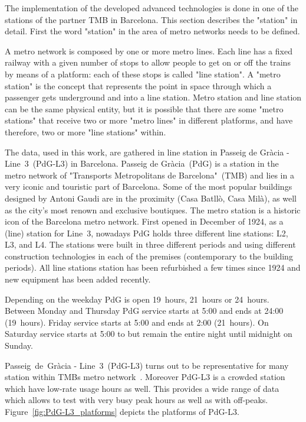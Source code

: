 The implementation of the developed advanced technologies is done in one of the stations of the partner TMB in Barcelona.
This section describes the "station" in detail. First the word "station" in the area of metro networks needs to be defined.

A metro network is composed by one or more metro lines. Each line has a fixed railway with a given number of stops to allow people to get on or off the trains by means of a platform: each of these stops is called "line station". A "metro station" is the concept that represents the point in space through which a passenger gets underground and into a line station. Metro station and line station can be the same physical entity, but it is possible that there are some "metro stations" that receive two or more "metro lines" in different platforms, and have therefore, two or more "line stations" within.

The data, used in this work, are gathered in line station in Passeig de Gr\`{a}cia - Line~3~(PdG-L3) in Barcelona. Passeig de Gr\`{a}cia~(PdG) is a station in the metro network of "Transports Metropolitans de Barcelona"~(TMB) and lies in a very iconic and touristic part of Barcelona. Some of the most popular buildings designed by Antoni Gaudi are in the proximity (Casa Batll\`{o}, Casa Mil\`{a}), as well as the city's most renown and exclusive boutiques.
The metro station is a historic icon of the Barcelona metro network. First opened in December of 1924, as a (line) station for Line~3, nowadays PdG holds three different line stations: L2, L3, and L4. The stations were built in three different periods and using different construction technologies in each of the premises (contemporary to the building periods). All line stations station has been refurbished a few times since 1924 and new equipment has been added recently.

Depending on the weekday PdG is open 19~hours, 21~hours or 24~hours. Between Monday and Thursday PdG service starts at 5:00 and ends at 24:00 (19~hours). Friday service starts at 5:00 and ends at 2:00 (21~hours). On Saturday service starts at 5:00 to but remain the entire night until midnight on Sunday.

Passeig~de~Gr\`{a}cia - Line~3~(PdG-L3) turns out to be representative for many station within TMBs metro network~\cite{TMB}. Moreover PdG-L3 is a crowded station which have low-rate usage hours as well. This provides a wide range of data which allows to test with very busy peak hours as well as with off-peaks. Figure~\ref{fig:PdG-L3_platforms} depicts the platforms of PdG-L3.

